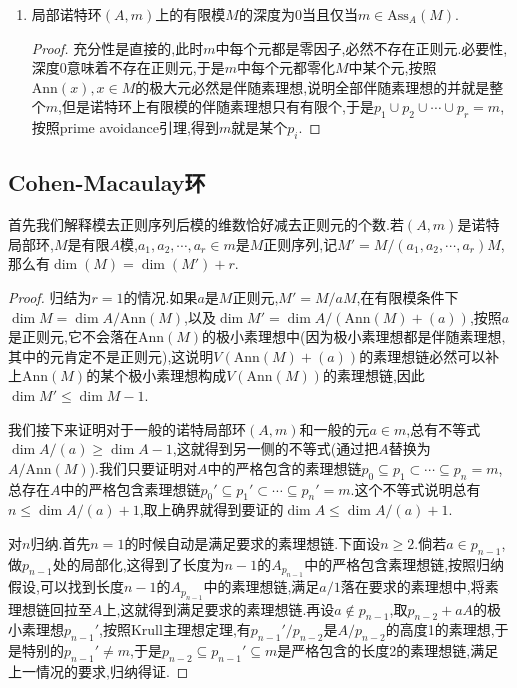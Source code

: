 \begin{enumerate}
\begin{proof}
		按照上一定理,$\mathrm{depth}(I,M)=n$当且仅当$q=0$,当且仅当$H_i(\underline{y},M)=0,\forall i>0$.我们之前证明过这在1和2的条件下等价于讲$\underline{y}$是$M$正则序列.
	\end{proof}
    \item 局部诺特环$(A,m)$上的有限模$M$的深度为0当且仅当$m\in\mathrm{Ass}_A(M)$.
    \begin{proof}
    	
    	充分性是直接的,此时$m$中每个元都是零因子,必然不存在正则元.必要性,深度0意味着不存在正则元,于是$m$中每个元都零化$M$中某个元,按照$\mathrm{Ann}(x),x\in M$的极大元必然是伴随素理想,说明全部伴随素理想的并就是整个$m$,但是诺特环上有限模的伴随素理想只有有限个,于是$p_1\cup p_2\cup\cdots\cup p_r=m$,按照prime avoidance引理,得到$m$就是某个$p_i$.
    \end{proof}
\end{enumerate}
\newpage
\subsection{Cohen-Macaulay环}

首先我们解释模去正则序列后模的维数恰好减去正则元的个数.若$(A,m)$是诺特局部环,$M$是有限$A$模,$a_1,a_2,\cdots,a_r\in m$是$M$正则序列,记$M'=M/(a_1,a_2,\cdots,a_r)M$,那么有$\dim(M)=\dim(M')+r$.
\begin{proof}
	
	归结为$r=1$的情况.如果$a$是$M$正则元,$M'=M/aM$,在有限模条件下$\dim M=\dim A/\mathrm{Ann}(M)$,以及$\dim M'=\dim A/(\mathrm{Ann}(M)+(a))$,按照$a$是正则元,它不会落在$\mathrm{Ann}(M)$的极小素理想中(因为极小素理想都是伴随素理想,其中的元肯定不是正则元),这说明$V(\mathrm{Ann}(M)+(a))$的素理想链必然可以补上$\mathrm{Ann}(M)$的某个极小素理想构成$V(\mathrm{Ann}(M))$的素理想链,因此$\dim M'\le\dim M-1$.
	
	我们接下来证明对于一般的诺特局部环$(A,m)$和一般的元$a\in m$,总有不等式$\dim A/(a)\ge\dim A-1$,这就得到另一侧的不等式(通过把$A$替换为$A/\mathrm{Ann}(M)$).我们只要证明对$A$中的严格包含的素理想链$p_0\subseteq p_1\subset\cdots\subseteq p_n=m$,总存在$A$中的严格包含素理想链$p_0'\subseteq p_1'\subset\cdots\subseteq p_n'=m$.这个不等式说明总有$n\le\dim A/(a)+1$,取上确界就得到要证的$\dim A\le\dim A/(a)+1$.
	
	对$n$归纳.首先$n=1$的时候自动是满足要求的素理想链.下面设$n\ge2$.倘若$a\in p_{n-1}$,做$p_{n-1}$处的局部化,这得到了长度为$n-1$的$A_{p_{n-1}}$中的严格包含素理想链,按照归纳假设,可以找到长度$n-1$的$A_{p_{n-1}}$中的素理想链,满足$a/1$落在要求的素理想中,将素理想链回拉至$A$上,这就得到满足要求的素理想链.再设$a\not\in p_{n-1}$,取$p_{n-2}+aA$的极小素理想$p_{n-1}'$,按照Krull主理想定理,有$p_{n-1}'/p_{n-2}$是$A/p_{n-2}$的高度1的素理想,于是特别的$p_{n-1}'\not=m$,于是$p_{n-2}\subseteq p_{n-1}'\subseteq m$是严格包含的长度2的素理想链,满足上一情况的要求,归纳得证.
\end{proof}

